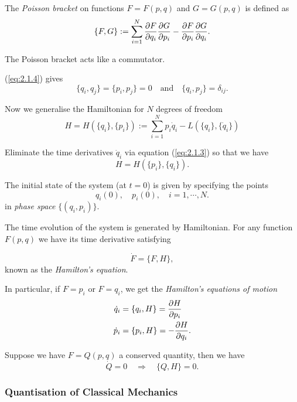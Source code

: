 \documentclass[a4paper,11pt]{article}
\begin{document}
	\begin{defi}
		The \emph{Poisson bracket} on functions $F = F(p,q)$ and $G = G(p,q)$ is defined as
		\begin{equation}
			\{F,G\} := \sum _{i = 1}^{N} \pdv{F}{q_i} \pdv{G}{p_i} - \pdv{F}{p_i} \pdv{G}{q_i}.
			\label{eq:2.1.4}
		\end{equation}
	\end{defi}

	\begin{nt}
		The Poisson bracket acts like a commutator.
	\end{nt}

	(\ref{eq:2.1.4}) gives 
	\begin{equation}
		\{q_i, q_j\} = \{p_i, p_j\} = 0 \quad \text{and} \quad \{q_i, p_j\} = \delta _{ij}.
		\label{eq:2.1.5}
	\end{equation}

	Now we generalise the Hamiltonian for $N$ degrees of freedom
	\begin{equation*}
		H = H(\{q_i\}, \{p_i\}) := \sum _{i=1} ^{N} p_i \dot{q}_i - L (\{q_i\}, \{\dot{q}_i\})
	\end{equation*} 
	
	Eliminate the time derivatives $\dot{q}_i$ via equation (\ref{eq:2.1.3}) so that we have
	\[
		H = H(\{p_i\},\{q_i\}).
	\]
	
	The initial state of the system (at $t=0$) is given by specifying the points
	\[
		q_i(0), \quad p_i(0), \quad i = 1, \cdots, N.
	\]
	in \emph{phase space} $\{(q_i,p_i)\}$.
	
	The time evolution of the system is generated by Hamiltonian. For any function $F(p,q)$ we have its time derivative satisfying

	\begin{prop}
		\[
			\dot{F} = \{F,H\},
		\]
		known as the \emph{Hamilton's equation}.
	\end{prop}
	
	In particular, if $F= p_i$ or $F = q_i$, we get the \emph{Hamilton's equations of motion}
	\begin{align*}
		\dot{q}_i & = \{q_i, H\} = \pdv{H}{p_i}\\
		\dot{p}_i & = \{p_i, H\} = - \pdv{H}{q_i}.
	\end{align*}

	Suppose we have $F = Q(p,q)$ a conserved quantity, then we have 
	\[
		\dot{Q} = 0 \quad \Rightarrow \quad \{Q,H\} = 0.
	\]
	
	\subsubsection{Quantisation of Classical Mechanics} 
\end{document}
